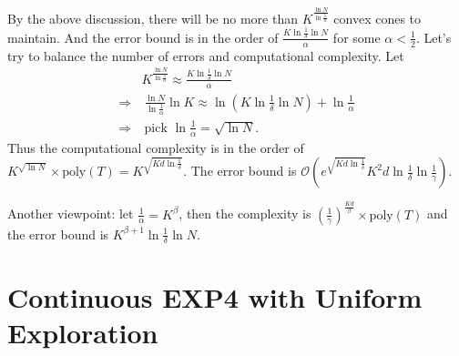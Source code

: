 \documentclass{article}
\begin{document}
By the above discussion, there will be no more than $K^{\frac{\ln N}{\ln \frac{1}{\alpha}}}$ convex cones to maintain. And the error bound is in the order of $\frac{K\ln\frac{1}{\delta}\ln N}{\alpha}$ for some $\alpha<\frac{1}{2}$. Let's try to balance the number of errors and computational complexity. Let
\begin{align*}
    &K^{\frac{\ln N}{\ln \frac{1}{\alpha}}}\approx\frac{K\ln\frac{1}{\delta}\ln N}{\alpha}\\
    \Rightarrow &~ \frac{\ln N}{\ln\frac{1}{\alpha}} \ln K \approx  \ln\left(K\ln\frac{1}{\delta}\ln N\right) + \ln\frac{1}{\alpha}\\
    \Rightarrow &~ \text{pick\ }\ln\frac{1}{\alpha}=\sqrt{\ln N}.
\end{align*}
Thus the computational complexity is in the order of $K^{\sqrt{\ln N}}\times \text{poly}(T)=K^{\sqrt{Kd\ln\frac{1}{\delta}}}$. The error bound is $\mathcal{O}\left( e^{\sqrt{Kd\ln \frac{1}{\delta}}} K^2 d \ln\frac{1}{\delta}\ln\frac{1}{\gamma} \right)$.

Another viewpoint: let $\frac{1}{\alpha}=K^\beta$, then the complexity is $\left(\frac{1}{\gamma}\right)^{\frac{Kd}{\beta}}\times \text{poly}(T)$ and the error bound is $K^{\beta+1}\ln\frac{1}{\delta}\ln N$. 
















\section{Continuous EXP4 with Uniform Exploration}
\end{document}
